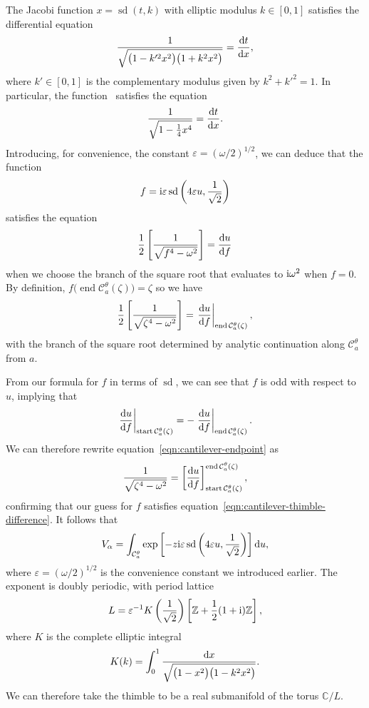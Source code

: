 \documentclass[pdftex]{sigma}
\newcommand{\Z}{\mathbb{Z}}
\newcommand{\C}{\mathbb{C}}
\numberwithin{equation}{section}
\begin{document}
The Jacobi function
$x = \operatorname{sd}(t, k)$
with elliptic modulus $k \in [0, 1]$ satisfies the differential equation~\cite[equation~(22.13.5)]{dlmf}
\[ \frac{1}{\sqrt{\bigl(1 - k'^2 x^2\bigr)\bigl(1 + k^2 x^2\bigr)}} = \frac{{\rm d}t}{{\rm d}x}, \]
where $k' \in [0, 1]$ is the complementary modulus given by $k^2 + k'^2 = 1$. In particular, the function~
satisfies the equation
\[
 \frac{1}{\sqrt{1 - \frac{1}{4} x^4}} = \frac{{\rm d}t}{{\rm d}x}.
 \]
Introducing, for convenience, the constant $\varepsilon = (\omega/2)^{1/2}$, we can deduce that the function
\[ f = {\rm i}\varepsilon \operatorname{sd}\left(4\varepsilon u, \frac{1}{\sqrt{2}}\right) \]
satisfies the equation
\[ \frac{1}{2} \left[ \frac{1}{\sqrt{f^4 - \omega^2}} \right] = \frac{{\rm d}u}{{\rm d}f} \]
when we choose the branch of the square root that evaluates to ${\rm i}\omega^2$ when $f = 0$. By definition, $f\bigl(\operatorname{end} \mathcal{C}_a^\theta(\zeta)\bigr) = \zeta$
so we have
\begin{equation}\label{eqn:cantilever-endpoint}
\frac{1}{2}\left[\frac{1}{\sqrt{\zeta^4 - \omega^2}}\right] = \left.\frac{{\rm d}u}{{\rm d}f}\right|_{\operatorname{end} \mathcal{C}_a^\theta(\zeta)},
\end{equation}
with the branch of the square root determined by analytic continuation along $\mathcal{C}_a^\theta$ from $a$.

From our formula for $f$ in terms of $\operatorname{sd}$, we can see that $f$ is odd with respect to $u$, implying that
\[ \left.\frac{{\rm d}u}{{\rm d}f}\right|_{\operatorname{start} \mathcal{C}_a^\theta(\zeta)} = -\left.\frac{{\rm d}u}{{\rm d}f}\right|_{\operatorname{end} \mathcal{C}_a^\theta(\zeta)}. \]
We can therefore rewrite equation~\eqref{eqn:cantilever-endpoint} as
\[ \frac{1}{\sqrt{\zeta^4-\omega^2}} = \left[\frac{{\rm d}u}{{\rm d}f}\right]_{\operatorname{start} \mathcal{C}_a^\theta(\zeta)}^{\operatorname{end} \mathcal{C}_a^\theta(\zeta)}, \]
confirming that our guess for $f$ satisfies equation~\eqref{eqn:cantilever-thimble-difference}. It follows that
\[ V_\alpha = \int_{\mathcal{C}_a^\theta} \exp\left[-z {\rm i}\varepsilon \operatorname{sd}\left(4\varepsilon u, \frac{1}{\sqrt{2}}\right) \right] {\rm d}u, \]
where $\varepsilon = (\omega/2)^{1/2}$ is the convenience constant we introduced earlier. The exponent is doubly periodic, with period lattice~\cite[Table~22.4.1]{dlmf}
\[ L = \varepsilon^{-1} K\left(\frac{1}{\sqrt{2}}\right)\left[\Z + \frac{1}{2}(1 + {\rm i}) \Z\right], \]
where $K$ is the complete elliptic integral~\cite[formula~(19.2.8)]{dlmf}
\[ K(k) = \int_0^1 \frac{{\rm d}x}{\sqrt{\bigl(1 - x^2\bigr)\bigl(1 - k^2 x^2\bigr)}}. \]
We can therefore take the thimble to be a real submanifold of the torus $\C / L$.
\end{document}
